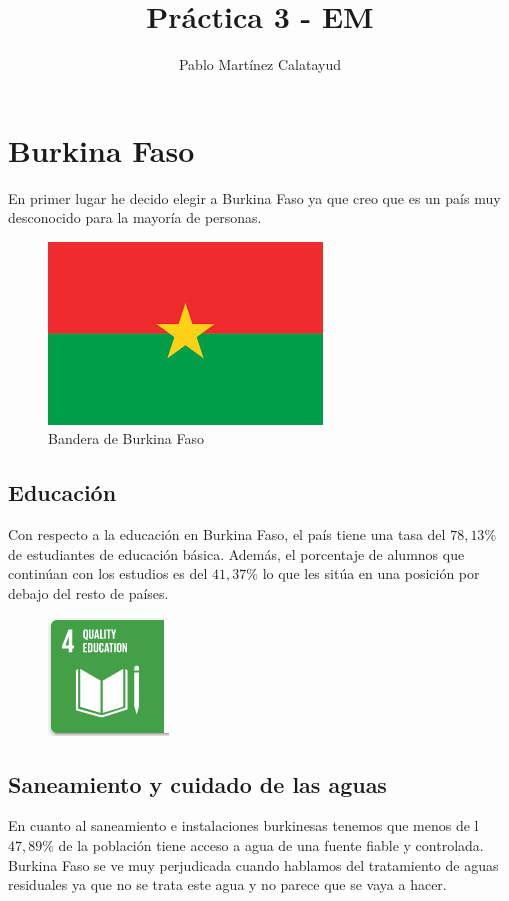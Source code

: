 \documentclass{article}[11pt]
\author{Pablo Martínez Calatayud}
\title{Práctica 3 - EM}
\begin{document}
\maketitle
\tableofcontents

\newpage

\section{Burkina Faso}
En primer lugar he decido elegir a Burkina Faso ya que creo que es un país muy desconocido para la mayoría de personas. 

\begin{figure}[h]
    \centering
        \includegraphics[scale=0.2]{images.png}
        \caption{Bandera de Burkina Faso}
\end{figure}

\subsection{Educación}
Con respecto a la educación en Burkina Faso, el país tiene una tasa del $78,13 \%$ de estudiantes de educación básica. Además, el porcentaje de alumnos que continúan con los estudios es del $41,37 \%$ lo que les sitúa en una posición por debajo del resto de países.


\begin{figure}[h]
    \centering
        \includegraphics[scale=0.9]{educacion-ods}
\end{figure}

\subsection{Saneamiento y cuidado de las aguas}
    En cuanto al saneamiento e instalaciones burkinesas tenemos que menos de l $47,89 \%$ de la población tiene acceso a agua de una fuente fiable y controlada.
    Burkina Faso se ve muy perjudicada cuando hablamos del tratamiento de aguas residuales ya que no se trata este agua y no parece que se vaya a hacer.
\end{document}
